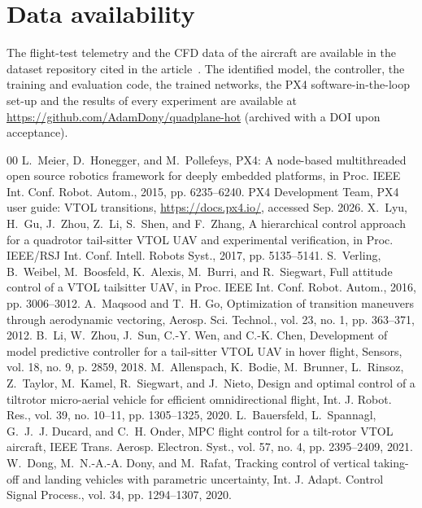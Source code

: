 \documentclass[final,5p,times,twocolumn]{elsarticle}
\begin{document}
\section*{Data availability}
The flight-test telemetry and the CFD data of the aircraft are available in the dataset repository cited in the article~\cite{Dony2026data}. The identified model, the controller, the training and evaluation code, the trained networks, the PX4 software-in-the-loop set-up and the results of every experiment are available at \url{https://github.com/AdamDony/quadplane-hot} (archived with a DOI upon acceptance).




\begin{thebibliography}{00}
 L.~Meier, D.~Honegger, and M.~Pollefeys, PX4: A node-based multithreaded open source robotics framework for deeply embedded platforms, in Proc. IEEE Int. Conf. Robot. Autom., 2015, pp. 6235--6240.
 PX4 Development Team, PX4 user guide: VTOL transitions, \url{https://docs.px4.io/}, accessed Sep. 2026.
 X.~Lyu, H.~Gu, J.~Zhou, Z.~Li, S.~Shen, and F.~Zhang, A hierarchical control approach for a quadrotor tail-sitter VTOL UAV and experimental verification, in Proc. IEEE/RSJ Int. Conf. Intell. Robots Syst., 2017, pp. 5135--5141.
 S.~Verling, B.~Weibel, M.~Boosfeld, K.~Alexis, M.~Burri, and R.~Siegwart, Full attitude control of a VTOL tailsitter UAV, in Proc. IEEE Int. Conf. Robot. Autom., 2016, pp. 3006--3012.
 A.~Maqsood and T.~H. Go, Optimization of transition maneuvers through aerodynamic vectoring, Aerosp. Sci. Technol., vol. 23, no. 1, pp. 363--371, 2012.
 B.~Li, W.~Zhou, J.~Sun, C.-Y. Wen, and C.-K. Chen, Development of model predictive controller for a tail-sitter VTOL UAV in hover flight, Sensors, vol. 18, no. 9, p. 2859, 2018.
 M.~Allenspach, K.~Bodie, M.~Brunner, L.~Rinsoz, Z.~Taylor, M.~Kamel, R.~Siegwart, and J.~Nieto, Design and optimal control of a tiltrotor micro-aerial vehicle for efficient omnidirectional flight, Int. J. Robot. Res., vol. 39, no. 10--11, pp. 1305--1325, 2020.
 L.~Bauersfeld, L.~Spannagl, G.~J.~J. Ducard, and C.~H. Onder, MPC flight control for a tilt-rotor VTOL aircraft, IEEE Trans. Aerosp. Electron. Syst., vol. 57, no. 4, pp. 2395--2409, 2021.
 W.~Dong, M.~N.-A.-A. Dony, and M.~Rafat, Tracking control of vertical taking-off and landing vehicles with parametric uncertainty, Int. J. Adapt. Control Signal Process., vol. 34, pp. 1294--1307, 2020.

\end{thebibliography}
\end{document}
